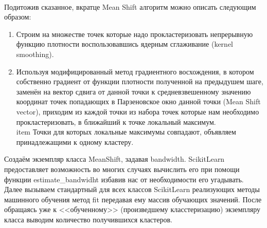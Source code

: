 \documentclass[11pt]{article}
\begin{document}
    \begin{center}
    \end{center}
    { \hspace*{\fill} \\}
    
    Подитожив сказанное, вкратце Mean Shift алгоритм можно описать следующим
образом:

\begin{enumerate}
\item Строим на множестве точек которые надо прокластеризовать непрерывную функцию плотности воспользовавшись ядерным сглаживание (kernel smoothing).
\item Используя модифицированный метод градиентного восхождения, в котором собственно градиент от функции плотности полученной на предыдушем шаге, заменён на вектор сдвига от данной точки к средневзвешенному значению координат точек попадающих в Парзеновское окно данной точки (Mean Shift vector), приходим из каждой точки из набора точек которые нам необходимо прокластеризовать, в ближайший к точке локальный максимум.
\\item Точки для которых локальные максимумы совпадают, объявляем принадлежащими к одному кластеру.
\end{enumerate}

    Создаём экземпляр класса MeanShift, задавая bandwidth. ScikitLearn
предоставляет возможность во многих случаях вычислить его при помощи
функции estimate\_bandwidht избавив нас от необходимости его угадывать.
Далее вызываем стандартный для всех классов ScikitLearn реализующих
методы машинного обучения метод fit передавая ему массив обучающих
значений. После обращаясь уже к <<обученному>> (произведшему
класстеризацию) экземпляру класса выводим количество получившихся
кластеров.
\end{document}
